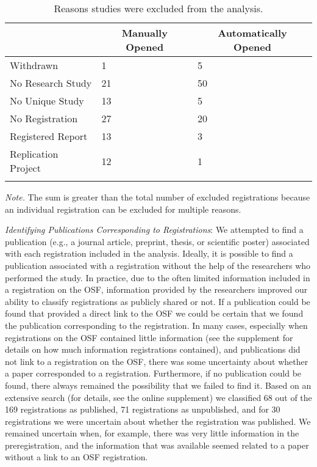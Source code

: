 \documentclass[
  ,jou, a4paper,floatsintext]{apa6}
\begin{document}
\begin{table*}[tbp]

\begin{center}
\begin{threeparttable}

\caption{\label{tab:table-excluded}Reasons studies were excluded from the analysis.}

\begin{tabular}{lll}
\toprule
 & \multicolumn{1}{c}{Manually Opened} & \multicolumn{1}{c}{Automatically Opened}\\
\midrule
Withdrawn & 1 & 5\\
No Research Study & 21 & 50\\
No Unique Study & 13 & 5\\
No Registration & 27 & 20\\
Registered Report & 13 & 3\\
Replication Project & 12 & 1\\
\bottomrule
\addlinespace
\end{tabular}

\begin{tablenotes}[para]
\normalsize{\textit{Note.} The sum is greater than the total number of excluded registrations because an individual registration can be excluded for multiple reasons.}
\end{tablenotes}

\end{threeparttable}
\end{center}

\end{table*}

\emph{Identifying Publications Corresponding to Registrations}: We attempted to find a publication (e.g., a journal article, preprint, thesis, or scientific poster) associated with each registration included in the analysis. Ideally, it is possible to find a publication associated with a registration without the help of the researchers who performed the study. In practice, due to the often limited information included in a registration on the OSF, information provided by the researchers improved our ability to classify registrations as publicly shared or not. If a publication could be found that provided a direct link to the OSF we could be certain that we found the publication corresponding to the registration. In many cases, especially when registrations on the OSF contained little information (see the supplement for details on how much information registrations contained), and publications did not link to a registration on the OSF, there was some uncertainty about whether a paper corresponded to a registration. Furthermore, if no publication could be found, there always remained the possibility that we failed to find it. Based on an extensive search (for details, see the online supplement) we classified 68 out of the 169 registrations as published, 71 registrations as unpublished, and for 30 registrations we were uncertain about whether the registration was published. We remained uncertain when, for example, there was very little information in the preregistration, and the information that was available seemed related to a paper without a link to an OSF registration.
\end{document}
